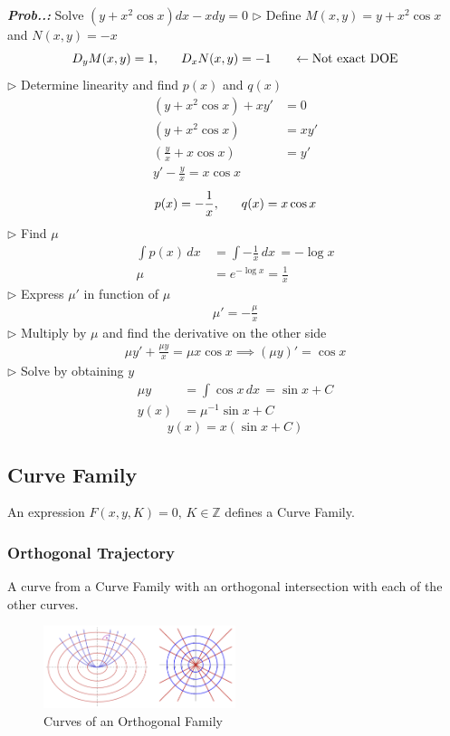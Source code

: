 \documentclass[a4paper]{article}
\begin{document}
\vspace{2ex}\textbf{\textit{Prob.\thesection.\theprob: }}Solve $(y+x^{2}\cos x)dx-xdy=0$ 
$\triangleright$ Define $M(x,y)=y+x^{2}\cos x$ and $N(x,y)=-x$
$$
D_{y}M(x,y)=1,\hspace{4ex}D_{x}N(x,y)=-1 \hspace{4ex}\leftarrow\text{Not exact DOE}
$$
$\triangleright$ Determine linearity and find $p(x)$ and $q(x)$
\begin{align}
(y+x^{2}\cos x)+xy'&=0 \\
(y+x^{2}\cos x)&=xy' \\
\left( \frac{y}{x}+x\cos x \right)&=y' \\
y'-\frac{y}{x}=x\cos x
\end{align}
$$
p(x)=-\frac{1}{x},\hspace{4ex}q(x)=x\cos x
$$
$\triangleright$ Find $\mu$
\begin{align}
\int p(x) \, dx\, &=\int -\frac{1}{x} \, dx\, =-\log x \\
\mu&=e^{ -\log x }=\frac{1}{x}
\end{align}
$\triangleright$ Express $\mu'$ in function of $\mu$
\begin{align}
\mu'=-\frac{\mu}{x}
\end{align}
$\triangleright$ Multiply by $\mu$ and find the derivative on the other side
\begin{align}
\mu y'+\frac{\mu y}{x}=\mu x\cos x \implies (\mu y)'=\cos x
\end{align}
$\triangleright$ Solve by obtaining $y$
\begin{align}
\mu y&=\int \cos x \, dx\, =\sin x+C  \\
y(x)&=\mu^{-1}\sin x+C
\end{align}
$$
\boxed{y(x)=x(\sin x+C)}
$$
\subsection{Curve Family}
An expression $F(x,y,K)=0,\,K\in\mathbb{Z}$ defines a Curve Family.

\subsubsection{Orthogonal Trajectory}
A curve from a Curve Family with an orthogonal intersection with each of the other curves.

\begin{figure}[H]
    \centering
    \includegraphics[width=0.5\textwidth]{IMG/ortho_fam.png}
    \caption{Curves of an Orthogonal Family}
    \label{fig:ortho_fam}
\end{figure}
\end{document}
